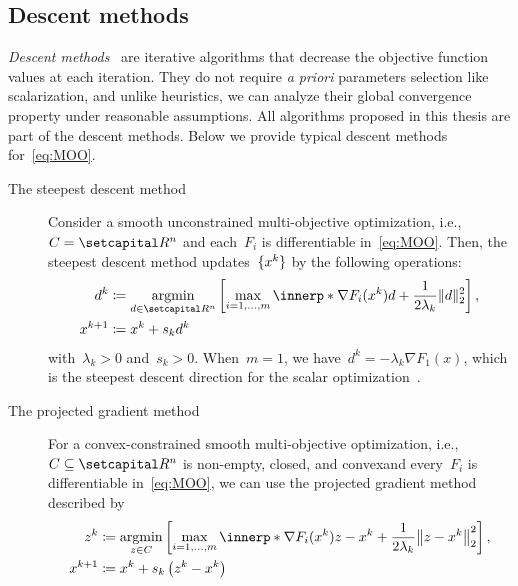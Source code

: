 \documentclass[../../main]{subfiles}
\begin{document}
\subsection{Descent methods} \label{sec:intro:multi_objective:descent}
\emph{Descent methods}~\cite{Fukuda2014} are iterative algorithms that decrease the objective function values at each iteration.
They do not require \emph{a priori} parameters selection like scalarization, and unlike heuristics, we can analyze their global convergence property under reasonable assumptions.
All algorithms proposed in this thesis are part of the descent methods.
Below we provide typical descent methods for~\cref{eq:MOO}.

\begin{example} \label{ex:descent}
    \begin{description}
        \item[The steepest descent method~\cite{Fliege2000}] Consider a smooth unconstrained multi-objective optimization, i.e.,~$C = \setR^n$ and each~$F_i$ is differentiable in~\cref{eq:MOO}.
            Then, the steepest descent method updates~$\lbrace x^k\rbrace$ by the following operations:
            \begin{align} \label{eq:steepest_descent}
                d^k &\coloneqq \argmin_{d \in \setR^n} \left[ \max_{i = 1, \dots, m} \innerp*{\nabla F_i(x^k)}{d} + \frac{1}{2 \lambda_k} \norm{d}_2^2 \right], \\
                x^{k + 1} &\coloneqq x^k + s_k d^k
            \end{align}
            with~$\lambda_k > 0$ and~$s_k > 0$.
            When~$m = 1$, we have~$d^k = - \lambda_k \nabla F_1(x)$, which is the steepest descent direction for the scalar optimization~\cite{Cauchy1847}.
        \item[The projected gradient method~\cite{Grana-Drummond2004,Fukuda2013}] For a convex-constrained smooth multi-objective optimization, i.e.,~$C \subseteq \setR^n$ is non-empty, closed, and convexand every~$F_i$ is differentiable in~\cref{eq:MOO}, we can use the projected gradient method described by
            \[ \label{eq:proj_grad}
                \begin{aligned} 
                    z^k &\coloneqq \argmin_{z \in C} \left[ \max_{i = 1, \dots, m} \innerp*{\nabla F_i(x^k)}{z - x^k} + \frac{1}{2 \lambda_k} \norm*{z - x^k}_2^2 \right], \\
                    x^{k + 1} &\coloneqq x^k + s_k \left(z^k - x^k \right)
                \end{aligned}
\]
\end{description}
\end{example}
\end{document}
